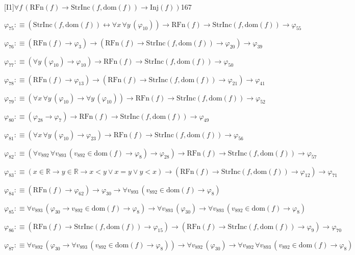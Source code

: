 \begin{fullproof}{[I1]}{$\forall f\,(\mathrm{RFn}(f) \to \mathrm{StrInc}(f,\mathrm{dom}(f)) \to \mathrm{Inj}(f))$}{167}
\begin{abbrevlist}
\item $\varphi_{75} :\equiv (\mathrm{StrInc}(f,\mathrm{dom}(f)) \leftrightarrow \forall x\,\forall y\,(\varphi_{10})) \to \mathrm{RFn}(f) \to \mathrm{StrInc}(f,\mathrm{dom}(f)) \to \varphi_{55}$
\item $\varphi_{76} :\equiv (\mathrm{RFn}(f) \to \varphi_{3}) \to (\mathrm{RFn}(f) \to \mathrm{StrInc}(f,\mathrm{dom}(f)) \to \varphi_{20}) \to \varphi_{39}$
\item $\varphi_{77} :\equiv (\forall y\,(\varphi_{10}) \to \varphi_{10}) \to \mathrm{RFn}(f) \to \mathrm{StrInc}(f,\mathrm{dom}(f)) \to \varphi_{50}$
\item $\varphi_{78} :\equiv (\mathrm{RFn}(f) \to \varphi_{13}) \to (\mathrm{RFn}(f) \to \mathrm{StrInc}(f,\mathrm{dom}(f)) \to \varphi_{21}) \to \varphi_{41}$
\item $\varphi_{79} :\equiv (\forall x\,\forall y\,(\varphi_{10}) \to \forall y\,(\varphi_{10})) \to \mathrm{RFn}(f) \to \mathrm{StrInc}(f,\mathrm{dom}(f)) \to \varphi_{52}$
\item $\varphi_{80} :\equiv (\varphi_{28} \to \varphi_{7}) \to \mathrm{RFn}(f) \to \mathrm{StrInc}(f,\mathrm{dom}(f)) \to \varphi_{49}$
\item $\varphi_{81} :\equiv (\forall x\,\forall y\,(\varphi_{10}) \to \varphi_{23}) \to \mathrm{RFn}(f) \to \mathrm{StrInc}(f,\mathrm{dom}(f)) \to \varphi_{56}$
\item $\varphi_{82} :\equiv (\forall v_{892}\,\forall v_{893}\,(v_{892} \in \mathrm{dom}(f) \to \varphi_{8}) \to \varphi_{28}) \to \mathrm{RFn}(f) \to \mathrm{StrInc}(f,\mathrm{dom}(f)) \to \varphi_{57}$
\item $\varphi_{83} :\equiv (x \in \mathbb{R} \to y \in \mathbb{R} \to x < y \lor x = y \lor y < x) \to (\mathrm{RFn}(f) \to \mathrm{StrInc}(f,\mathrm{dom}(f)) \to \varphi_{12}) \to \varphi_{71}$
\item $\varphi_{84} :\equiv (\mathrm{RFn}(f) \to \varphi_{62}) \to \varphi_{30} \to \forall v_{893}\,(v_{892} \in \mathrm{dom}(f) \to \varphi_{8})$
\item $\varphi_{85} :\equiv \forall v_{893}\,(\varphi_{30} \to v_{892} \in \mathrm{dom}(f) \to \varphi_{8}) \to \forall v_{893}\,(\varphi_{30}) \to \forall v_{893}\,(v_{892} \in \mathrm{dom}(f) \to \varphi_{8})$
\item $\varphi_{86} :\equiv (\mathrm{RFn}(f) \to \mathrm{StrInc}(f,\mathrm{dom}(f)) \to \varphi_{15}) \to (\mathrm{RFn}(f) \to \mathrm{StrInc}(f,\mathrm{dom}(f)) \to \varphi_{9}) \to \varphi_{70}$
\item $\varphi_{87} :\equiv \forall v_{892}\,(\varphi_{30} \to \forall v_{893}\,(v_{892} \in \mathrm{dom}(f) \to \varphi_{8})) \to \forall v_{892}\,(\varphi_{30}) \to \forall v_{892}\,\forall v_{893}\,(v_{892} \in \mathrm{dom}(f) \to \varphi_{8})$

\end{abbrevlist}
\end{fullproof}
